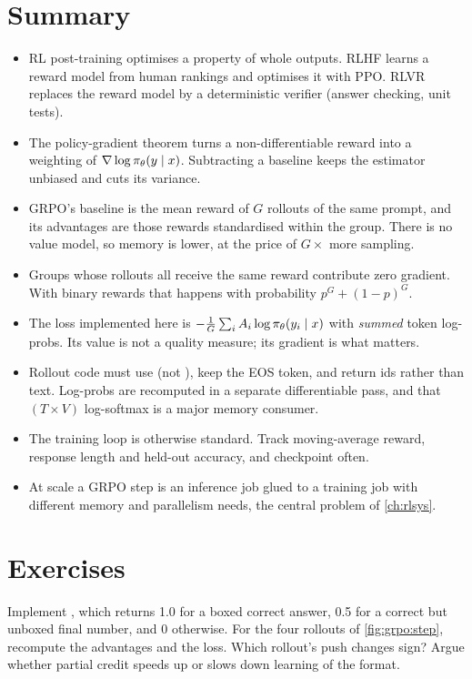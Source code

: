 \section{Summary}\label{sec:grpo:summary}
\begin{itemize}
\item RL post-training optimises a property of whole outputs. RLHF learns a reward model
from human rankings and optimises it with PPO. RLVR replaces the reward model by a
deterministic verifier (answer checking, unit tests).
\item The policy-gradient theorem turns a non-differentiable reward into a weighting of
$\nabla\log\pi_\theta(y\mid x)$. Subtracting a baseline keeps the estimator unbiased and cuts its
variance.
\item GRPO's baseline is the mean reward of $G$ rollouts of the same prompt, and its advantages
are those rewards standardised within the group. There is no value model, so memory is lower,
at the price of $G\times$ more sampling.
\item Groups whose rollouts all receive the same reward contribute zero gradient. With binary
rewards that happens with probability $p^G+(1-p)^G$.
\item The loss implemented here is $-\frac1G\sum_iA_i\log\pi_\theta(y_i\mid x)$ with
\emph{summed} token log-probs. Its value is not a quality measure; its gradient is what
matters.
\item Rollout code must use  (not ), keep the EOS token,
and return ids rather than text. Log-probs are recomputed in a separate differentiable
pass, and that $(T\times V)$ log-softmax is a major memory consumer.
\item The training loop is otherwise standard. Track moving-average reward, response
length and held-out accuracy, and checkpoint often.
\item At scale a GRPO step is an inference job glued to a training job with different memory
and parallelism needs, the central problem of \cref{ch:rlsys}.
\end{itemize}

\section{Exercises}\label{sec:grpo:exercises}

\begin{exercise}
Implement , which returns 1.0 for a boxed correct answer, 0.5 for a
correct but unboxed final number, and 0 otherwise. For the four rollouts of
\cref{fig:grpo:step}, recompute the advantages and the loss. Which rollout's push changes
sign? Argue whether partial credit speeds up or slows down learning of the format.
\end{exercise}

